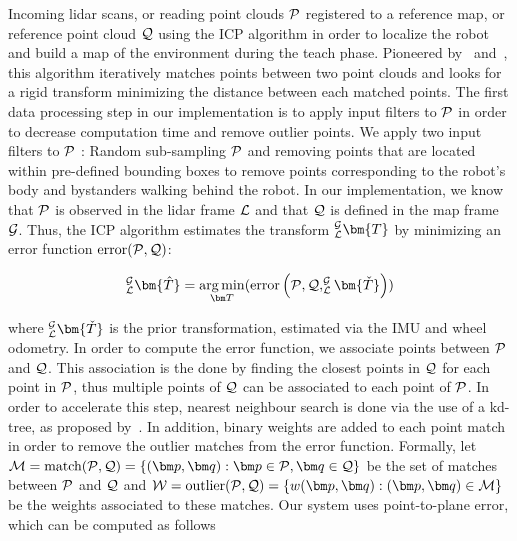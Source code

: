 Incoming lidar scans, or reading point clouds $\mathcal{P}$ registered to a reference map, or reference point cloud $\mathcal{Q}$ using the \ac{ICP} algorithm in order to localize the robot and build a map of the environment during the teach phase.
Pioneered by~\citet{Besl1992} and~\citet{Chen1991}, this algorithm iteratively matches points between two point clouds and looks for a rigid transform minimizing the distance between each matched points.
The first data processing step in our implementation is to apply input filters to $\mathcal{P}$ in order to decrease computation time and remove outlier points.
We apply two input filters to $\mathcal{P}$ : Random sub-sampling $\mathcal{P}$ and removing points that are located within pre-defined bounding boxes to remove points corresponding to the robot's body and bystanders walking behind the robot.
In our implementation, we know that $\mathcal{P}$ is observed in the lidar frame $\mathcal{L}$ and that $\mathcal{Q}$ is defined in the map frame $\mathcal{G}$. 
Thus, the \ac{ICP} algorithm estimates the transform $_{\lidarf}^{\mapf}\bm{T}$ by minimizing an error function $\text{error}(\mathcal{P}, \mathcal{Q})$:

\begin{equation}
	_{\lidarf}^{\mapf}\bm{\hat{T}} = \argmin_{\bm T} (\text{error} \left(\readpc, \refpc, _{\lidarf}^{\mapf}\bm{\check{T}} \right))
\end{equation}

where $_{\lidarf}^{\mapf}\bm{\check{T}}$ is the prior transformation, estimated via the \ac{IMU} and wheel odometry.
In order to compute the error function, we associate points between $\mathcal{P}$ and $\mathcal{Q}$.
This association is the done by finding the closest points in $\mathcal{Q}$ for each point in $\mathcal{P}$, thus multiple points of $\mathcal{Q}$ can be associated to each point of $\mathcal{P}$.
In order to accelerate this step, nearest neighbour search is done via the use of a kd-tree, as proposed by~\citet{Elseberg2012}.
In addition, binary weights are added to each point match in order to remove the outlier matches from the error function.
Formally, let $\match = \text{match}(\readpc, \refpc) = \{(\bm p, \bm q) : \bm p \in \readpc, \bm q \in \refpc \}$ be the set of matches between $\mathcal{P}$ and $\mathcal{Q}$ and $\weight = \text{outlier}(\readpc, \refpc) = \{w(\bm p, \bm q) : (\bm p, \bm q) \in \match\}$ be the weights associated to these matches.
Our system uses point-to-plane error, which can be computed as follows

